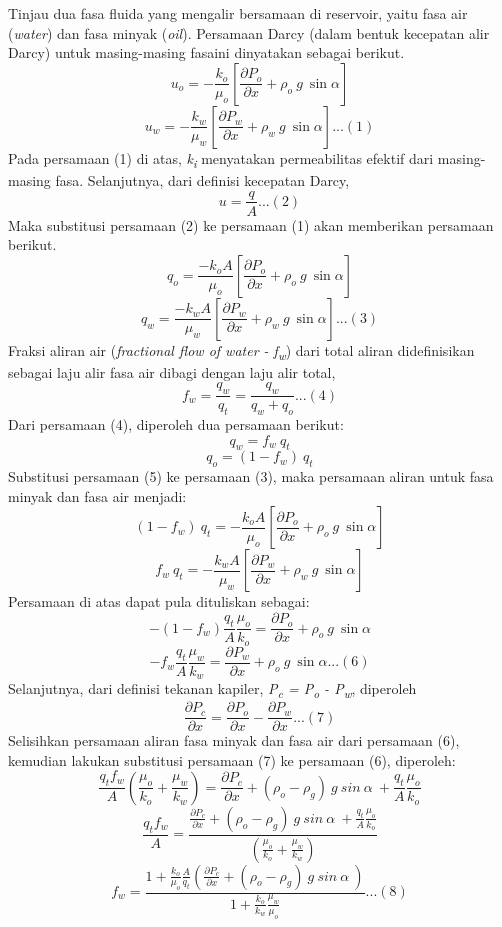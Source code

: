 \documentclass[
]{book}
\begin{document}
Tinjau dua fasa fluida yang mengalir bersamaan di reservoir, yaitu fasa air (\emph{water}) dan fasa minyak (\emph{oil}). Persamaan Darcy (dalam bentuk kecepatan alir Darcy) untuk masing-masing fasaini dinyatakan sebagai berikut.
\[u_o = -\frac{k_o}{\mu_o} \left[ \frac{\partial P_o}{\partial x}+ \rho_o\ g\ \sin \alpha \right]\]
\[u_w = -\frac{k_w}{\mu_w} \left[ \frac{\partial P_w}{\partial x}+\rho_w\ g\ \sin \alpha \right] ... (1)\]Pada persamaan (1) di atas, \emph{k\textsubscript{i}} menyatakan permeabilitas efektif dari masing-masing fasa. Selanjutnya, dari definisi kecepatan Darcy,
\[u = \frac{q}{A}...(2)\]
Maka substitusi persamaan (2) ke persamaan (1) akan memberikan persamaan berikut.
\[q_o = \frac{-k_o A}{\mu_o} \left[ \frac{\partial P_o}{\partial x}+ \rho_o\ g\ \sin \alpha \right] \]
\[q_w = \frac{-k_w A}{\mu_w} \left[ \frac{\partial P_w}{\partial x}+ \rho_w\ g\ \sin \alpha \right]...(3) \]
Fraksi aliran air (\emph{fractional flow of water - f\textsubscript{w}}) dari total aliran didefinisikan sebagai laju alir fasa air dibagi dengan laju alir total,
\[f_w = \frac{q_w}{q_t} = \frac{q_w}{q_w+q_o}...(4)\]
Dari persamaan (4), diperoleh dua persamaan berikut:
\[q_w = f_w\ q_t\]
\[q_o = (1-f_w)\ q_t\]
Substitusi persamaan (5) ke persamaan (3), maka persamaan aliran untuk fasa minyak dan fasa air menjadi:
\[(1-f_w)\ q_t = -\frac{k_o A}{\mu_o} \left[ \frac{\partial P_o}{\partial x}+ \rho_o\ g\ \sin \alpha \right]\]
\[f_w\ q_t = -\frac{k_w A}{\mu_w} \left[ \frac{\partial P_w}{\partial x}+ \rho_w\ g\ \sin \alpha \right]\]
Persamaan di atas dapat pula dituliskan sebagai:
\[-(1-f_w) \frac{q_t}{A} \frac{\mu_o}{k_o} = \frac{\partial P_o}{\partial x}+ \rho_o\ g\ \sin \alpha \]
\[-f_w \frac{q_t}{A} \frac{\mu_w}{k_w} = \frac{\partial P_w}{\partial x}+ \rho_o\ g\ \sin \alpha...(6) \]
Selanjutnya, dari definisi tekanan kapiler, \emph{P\textsubscript{c} = P\textsubscript{o} - P\textsubscript{w}}, diperoleh
\[\frac{\partial P_c}{\partial x} = \frac{\partial P_o}{\partial x} - \frac{\partial P_w}{\partial x}...(7)\]
Selisihkan persamaan aliran fasa minyak dan fasa air dari persamaan (6), kemudian lakukan substitusi persamaan (7) ke persamaan (6), diperoleh:
\[\frac{q_t f_w}{A} \left( \frac{\mu_o}{k_o} +\frac{\mu_w}{k_w} \right) = \frac{\partial P_c}{\partial x} + (\rho_o - \rho_g)\ g\ sin\ \alpha\ + \frac{q_t}{A} \frac{\mu_o}{k_o} \]
\[\frac{q_t f_w}{A} = \frac{\frac{\partial P_c}{\partial x} + (\rho_o - \rho_g)\ g\ sin\ \alpha\ + \frac{q_t}{A} \frac{\mu_o}{k_o}}{\left( \frac{\mu_o}{k_o} +\frac{\mu_w}{k_w} \right)}\]
\[f_w = \frac{1+\frac{k_o}{\mu_o}\frac{A}{q_t} \left( \frac{\partial P_c}{\partial x} + (\rho_o - \rho_g)\ g\ sin\ \alpha\ \right)}{1+\frac{k_o}{k_w}\frac{\mu_w}{\mu_o}}...(8)\]
\end{document}
